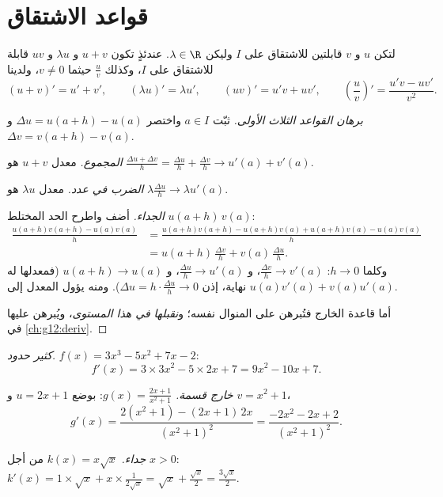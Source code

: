 \section{قواعد الاشتقاق}

\begin{theorem}[العمليات]\label{thm:g11:deriv:rules}
لتكن $u$ و $v$ قابلتين للاشتقاق على $I$ وليكن $\lambda \in \R$. عندئذٍ تكون
$u + v$ و $\lambda u$ و $uv$ قابلة للاشتقاق على $I$، وكذلك
$\frac{u}{v}$ حيثما $v \neq 0$، ولدينا
\[
(u+v)' = u' + v', \qquad
(\lambda u)' = \lambda u', \qquad
(uv)' = u'v + uv', \qquad
\left(\frac{u}{v}\right)' = \frac{u'v - uv'}{v^2}.
\]
\end{theorem}

\begin{proof}[برهان القواعد الثلاث الأولى]
ثبّت $a \in I$ واختصر $\Delta u = u(a+h) - u(a)$ و
$\Delta v = v(a+h) - v(a)$.

\emph{المجموع.} معدل $u + v$ هو
$\frac{\Delta u + \Delta v}{h} = \frac{\Delta u}{h} + \frac{\Delta v}{h}
\to u'(a) + v'(a)$.

\emph{الضرب في عدد.} معدل $\lambda u$ هو
$\lambda \frac{\Delta u}{h} \to \lambda u'(a)$.

\emph{الجداء.} أضف واطرح الحد المختلط $u(a+h)\,v(a)$:
\begin{align*}
\frac{u(a+h)v(a+h) - u(a)v(a)}{h}
&= \frac{u(a+h)v(a+h) - u(a+h)v(a) + u(a+h)v(a) - u(a)v(a)}{h}\\
&= u(a+h)\,\frac{\Delta v}{h} + v(a)\,\frac{\Delta u}{h}.
\end{align*}
وكلما $h \to 0$: $\frac{\Delta v}{h} \to v'(a)$، و $\frac{\Delta u}{h} \to
u'(a)$، و $u(a+h) \to u(a)$ (فمعدلها له نهاية، إذن
$\Delta u = h \cdot \frac{\Delta u}{h} \to 0$). ومنه يؤول المعدل
إلى $u(a)v'(a) + v(a)u'(a)$.

أما قاعدة الخارج فتُبرهن على المنوال نفسه؛ و\emph{نقبلها في هذا
المستوى}، ويُبرهن عليها في \cref{ch:g12:deriv}.
\end{proof}

\begin{example}\label{ex:g11:deriv:computations}
\emph{كثير حدود.} $f(x) = 3x^3 - 5x^2 + 7x - 2$:
\[
f'(x) = 3 \times 3x^2 - 5 \times 2x + 7 = 9x^2 - 10x + 7 .
\]

\emph{خارج قسمة.} $g(x) = \frac{2x+1}{x^2+1}$: بوضع $u = 2x + 1$ و $v = x^2
+ 1$،
\[
g'(x) = \frac{2(x^2+1) - (2x+1)\,2x}{(x^2+1)^2}
= \frac{-2x^2 - 2x + 2}{(x^2+1)^2}.
\]

\emph{جداء.} $k(x) = x\sqrt x$ من أجل $x > 0$:
$k'(x) = 1 \times \sqrt x + x \times \frac{1}{2\sqrt x}
= \sqrt x + \frac{\sqrt x}{2} = \frac{3\sqrt x}{2}$.
\end{example}

